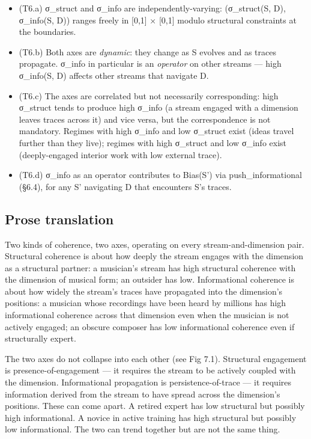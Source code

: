 \documentclass[11pt, openany]{book}
\begin{document}
\begin{itemize}
\item (T6.a) σ\_\allowbreak{}struct and σ\_\allowbreak{}info are independently-varying: (σ\_\allowbreak{}struct(S, D), σ\_\allowbreak{}info(S, D)) ranges freely in [0,1] × [0,1] modulo structural constraints at the boundaries.
\item (T6.b) Both axes are \textit{dynamic}: they change as S evolves and as traces propagate. σ\_\allowbreak{}info in particular is an \textit{operator} on other streams --- high σ\_\allowbreak{}info(S, D) affects other streams that navigate D.
\item (T6.c) The axes are correlated but not necessarily corresponding: high σ\_\allowbreak{}struct tends to produce high σ\_\allowbreak{}info (a stream engaged with a dimension leaves traces across it) and vice versa, but the correspondence is not mandatory. Regimes with high σ\_\allowbreak{}info and low σ\_\allowbreak{}struct exist (ideas travel further than they live); regimes with high σ\_\allowbreak{}struct and low σ\_\allowbreak{}info exist (deeply-engaged interior work with low external trace).
\item (T6.d) σ\_\allowbreak{}info as an operator contributes to Bias(S') via push\_\allowbreak{}informational (§6.4), for any S' navigating D that encounters S's traces.
\end{itemize}

\subsection{Prose translation}

Two kinds of coherence, two axes, operating on every stream-and-dimension pair. Structural coherence is about how deeply the stream engages with the dimension as a structural partner: a musician's stream has high structural coherence with the dimension of musical form; an outsider has low. Informational coherence is about how widely the stream's traces have propagated into the dimension's positions: a musician whose recordings have been heard by millions has high informational coherence across that dimension even when the musician is not actively engaged; an obscure composer has low informational coherence even if structurally expert.

The two axes do not collapse into each other (see Fig 7.1). Structural engagement is presence-of-engagement --- it requires the stream to be actively coupled with the dimension. Informational propagation is persistence-of-trace --- it requires information derived from the stream to have spread across the dimension's positions. These can come apart. A retired expert has low structural but possibly high informational. A novice in active training has high structural but possibly low informational. The two can trend together but are not the same thing.
\end{document}
